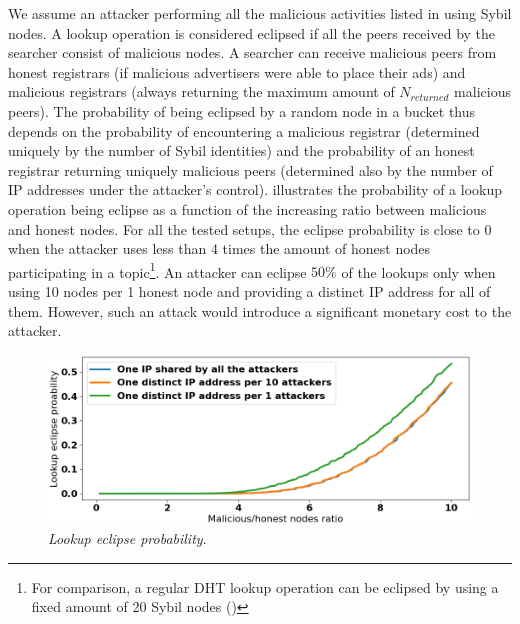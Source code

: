 We assume an attacker performing all the malicious activities listed in  using Sybil nodes. A lookup operation is considered eclipsed if all the peers received by the searcher consist of malicious nodes. A searcher can receive malicious peers from honest registrars (if malicious advertisers were able to place their ads) and malicious registrars (always returning the maximum amount of $N_\textit{returned}$ malicious peers). The probability of being eclipsed by a random node in a bucket thus depends on the probability of encountering a malicious registrar (determined uniquely by the number of Sybil identities) and the probability of an honest registrar returning uniquely malicious peers (determined also by the number of IP addresses under the attacker's control).  illustrates the probability of a lookup operation being eclipse as a function of the increasing ratio between malicious and honest nodes. For all the tested setups, the eclipse probability is close to $0$ when the attacker uses less than 4 times the amount of honest nodes participating in a topic\footnote{For comparison, a regular DHT lookup operation can be eclipsed by using a fixed amount of 20 Sybil nodes ()}. An attacker can eclipse $50\%$  of the lookups only when using 10 nodes per 1 honest node and providing a distinct IP address for all of them. However, such an attack would introduce a significant monetary cost to the attacker. 

\begin{figure}[t]
    \includegraphics[width=1\linewidth]{img/eclipse_probability}
    \vspace{-0.05in}
    \caption{\emph{Lookup eclipse probability}.
    }
    \label{fig:eclipse_probability}
    \vspace{-0.20in}
\end{figure}

